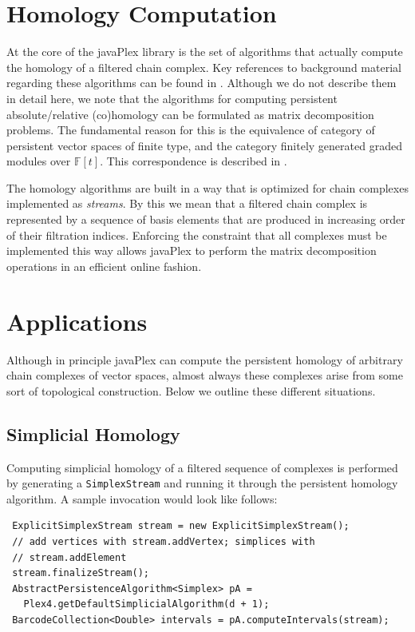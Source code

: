 \documentclass[runningheads,a4paper]{llncs}
\begin{document}
\section{Homology Computation}

At the core of the javaPlex library is the set of algorithms that actually compute the homology of a filtered chain complex. Key references to background material regarding these algorithms can be found in \cite{Carlsson_04,Dualities}. Although we do not describe them in detail here, we note that the algorithms for computing persistent absolute/relative (co)homology can be formulated as matrix decomposition problems. The fundamental reason for this is the equivalence of category of persistent vector spaces of finite type, and the category finitely generated graded modules over $\mathbb{F}[t]$. This correspondence is described in \cite{Carlsson_04}. 

The homology algorithms are built in a way that is optimized for chain complexes implemented as \emph{streams}. By this we mean that a filtered chain complex is represented by a sequence of basis elements that are produced in increasing order of their filtration indices. Enforcing the constraint that all complexes must be implemented this way allows javaPlex to perform the matrix decomposition operations in an efficient online fashion.

\section{Applications}

Although in principle javaPlex can compute the persistent homology of arbitrary chain complexes of vector spaces, almost always these complexes arise from some sort of topological construction. Below we outline these different situations.

\subsection{Simplicial Homology}
\label{sec:simplicial-homology}

Computing simplicial homology of a filtered sequence of complexes is
performed by generating a \texttt{SimplexStream} and running it
through the persistent homology algorithm. A sample invocation would look
like follows:

\begin{verbatim}
 ExplicitSimplexStream stream = new ExplicitSimplexStream();
 // add vertices with stream.addVertex; simplices with
 // stream.addElement
 stream.finalizeStream();
 AbstractPersistenceAlgorithm<Simplex> pA = 
   Plex4.getDefaultSimplicialAlgorithm(d + 1);
 BarcodeCollection<Double> intervals = pA.computeIntervals(stream);
\end{verbatim}
\end{document}
